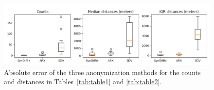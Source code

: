 
        \begin{figure}
        \begin{center}
        \includegraphics[width=0.85\linewidth]{abs_err_tab1_tab2}
        \caption{Absolute error of the three anonymization methods for the counts and distances in Tables~\ref{tab:table1} and \ref{tab:table2}.
        }
        \label{fig:abs_err_tab1_tab2}
        \end{center}
        \end{figure}
    